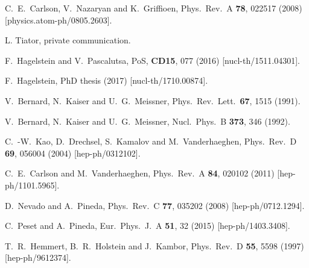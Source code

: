 \documentclass[twocolumn,prc,showpacs,nofootinbib,preprintnumbers,amsmath,amssymb,superscriptaddress]{revtex4-1}
\begin{document}
\begin{thebibliography}{99}
  
  C.~E.~Carlson, V.~Nazaryan and K.~Griffioen,
  Phys.\ Rev.\ A {\bf 78}, 022517 (2008)
  [physics.atom-ph/0805.2603].

L. Tiator, private communication.

F.~Hagelstein and V.~Pascalutsa, PoS, {\bf CD15}, 077 (2016) [nucl-th/1511.04301].


F.~Hagelstein, PhD thesis (2017) [nucl-th/1710.00874].


  V.~Bernard, N.~Kaiser and U.~G.~Meissner,
  Phys.\ Rev.\ Lett.\  {\bf 67}, 1515 (1991).

  V.~Bernard, N.~Kaiser and U.~G.~Meissner,
  Nucl.\ Phys.\ B {\bf 373}, 346 (1992).
  
  C.~-W.~Kao, D.~Drechsel, S.~Kamalov and M.~Vanderhaeghen,
  Phys.\ Rev.\ D {\bf 69}, 056004 (2004)
  [hep-ph/0312102].

  C.~E.~Carlson and M.~Vanderhaeghen,
  Phys.\ Rev.\ A {\bf 84}, 020102 (2011)
  [hep-ph/1101.5965].
  
  D.~Nevado and A.~Pineda,
  Phys.\ Rev.\ C {\bf 77}, 035202 (2008)
  [hep-ph/0712.1294].
  
  C.~Peset and A.~Pineda,
Eur.\ Phys.\ J.\ A {\bf 51}, 32 (2015)  [hep-ph/1403.3408].

  
  T.~R.~Hemmert, B.~R.~Holstein and J.~Kambor,
  Phys.\ Rev.\ D {\bf 55}, 5598 (1997)
  [hep-ph/9612374].


\end{thebibliography}
\end{document}
